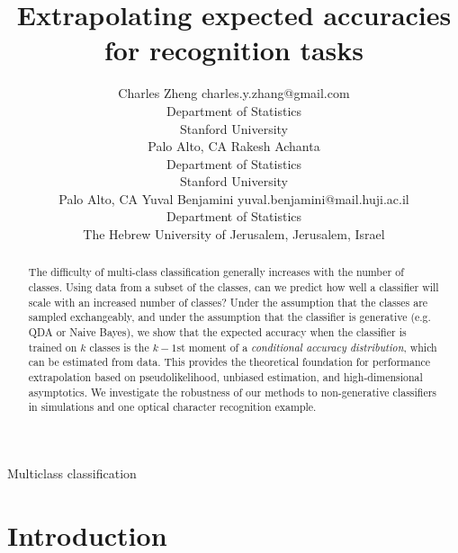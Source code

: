 \documentclass[twoside,11pt]{article}
\begin{document}
\title{Extrapolating expected accuracies for recognition tasks}


\author{\name Charles Zheng \email charles.y.zhang@gmail.com \\
       \addr Department of Statistics\\
       Stanford University\\
       Palo Alto, CA 
       \AND
       \name Rakesh Achanta \email  \\
       \addr Department of Statistics\\
       Stanford University\\
       Palo Alto, CA 
       \AND
       \name Yuval Benjamini \email yuval.benjamini@mail.huji.ac.il \\
       \addr Department of Statistics\\
       The Hebrew University of Jerusalem,
       Jerusalem, Israel}

\maketitle

\begin{abstract}%
The difficulty of multi-class classification generally increases with
the number of classes.  Using data from a subset of the classes, can
we predict how well a classifier will scale with an increased number
of classes?  Under the assumption that the classes are sampled
exchangeably, and under the assumption that the classifier is
generative (e.g. QDA or Naive Bayes), we show that the expected
accuracy when the classifier is trained on $k$ classes is the $k-1$st
moment of a \emph{conditional accuracy distribution}, which can be
estimated from data.  This provides the theoretical foundation for
performance extrapolation based on pseudolikelihood, unbiased
estimation, and high-dimensional asymptotics.  We investigate the
robustness of our methods to non-generative classifiers in simulations
and one optical character recognition example.
\end{abstract}

\begin{keywords}
Multiclass classification
\end{keywords}
\section{Introduction}\label{sec:recog_tasks}
\end{document}
